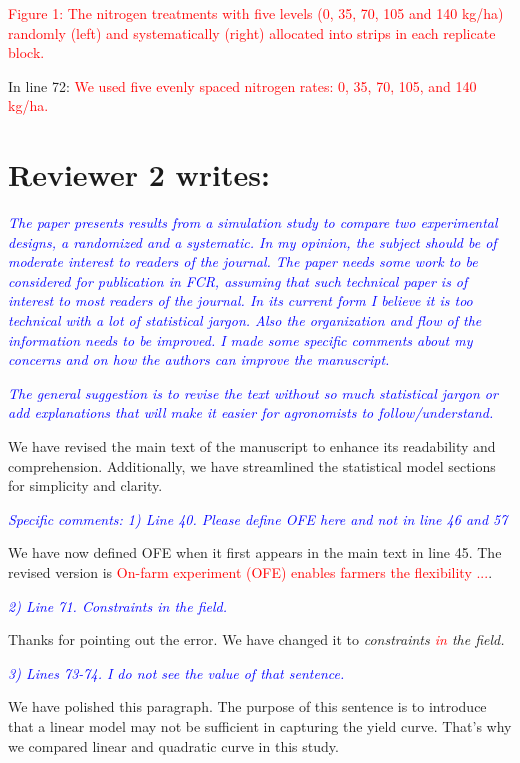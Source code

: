 \documentclass[a4paper]{article}   	%
\newcommand{\revision}[1]{\textcolor{red}{#1}}
\newcommand{\reviewer}[1]{\textcolor{blue}{\textit{#1}}}
\begin{document}
\revision{Figure 1: The nitrogen treatments with five levels (0, 35, 70, 105 and 140 kg/ha) randomly (left) and systematically (right) allocated into strips in each replicate block.}

In line 72: \revision{We used five evenly spaced nitrogen rates: 0, 35, 70, 105, and 140 kg/ha.}

\section*{Reviewer 2 writes:}

\reviewer{The paper presents results from a simulation study to compare two experimental designs, a randomized and a systematic. In my opinion, the subject should be of moderate interest to readers of the journal. The paper needs some work to be considered for publication in FCR, assuming that such technical paper is of interest to most readers of the journal. In its current form I believe it is too technical with a lot of statistical jargon. Also the organization and flow of the information needs to be improved. I made some specific comments about my concerns and on how the authors can improve the manuscript.}

\reviewer{The general suggestion is to revise the text without so much statistical jargon or add explanations that will make it easier for agronomists to follow/understand.}

We have revised the main text of the manuscript to enhance its readability and comprehension. Additionally, we have streamlined the statistical model sections for simplicity and clarity.



\reviewer{Specific comments: 1) Line 40. Please define OFE here and not in line 46 and 57}

We have now defined OFE when it first appears in the main text in line 45. The revised version is \revision{On-farm experiment (OFE) enables farmers the flexibility ...}. 


\reviewer{2) Line 71. Constraints in the field.}

Thanks for pointing out the error. We have changed it to \textit{constraints \revision{in} the field.}

\reviewer{3) Lines 73-74. I do not see the value of that sentence.}

We have polished this paragraph. The purpose of this sentence is to introduce that a linear model may not be sufficient in capturing the yield curve. That's why we compared linear and quadratic curve in this study. 
\end{document}
